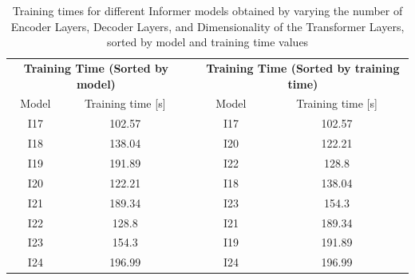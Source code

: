 \begin{table}[]
    \begin{tabular}{ccccc}
    \multicolumn{2}{c}{\textbf{Training   Time (Sorted by model)}} &  & \multicolumn{2}{c}{\textbf{Training Time (Sorted   by training time)}} \\
    Model             & Training time {[}s{]}                      &  & Model                 & Training time {[}s{]}                          \\
    I17               & \cellcolor[HTML]{63BE7B}102.57             &  & I17                   & \cellcolor[HTML]{63BE7B}102.57                 \\
    I18               & \cellcolor[HTML]{E1E282}138.04             &  & I20                   & \cellcolor[HTML]{A9D27F}122.21                 \\
    I19               & \cellcolor[HTML]{F9776E}191.89             &  & I22                   & \cellcolor[HTML]{C0D980}128.8                  \\
    I20               & \cellcolor[HTML]{A9D27F}122.21             &  & I18                   & \cellcolor[HTML]{E1E282}138.04                 \\
    I21               & \cellcolor[HTML]{FA7D6F}189.34             &  & I23                   & \cellcolor[HTML]{FED781}154.3                  \\
    I22               & \cellcolor[HTML]{C0D980}128.8              &  & I21                   & \cellcolor[HTML]{FA7D6F}189.34                 \\
    I23               & \cellcolor[HTML]{FED781}154.3              &  & I19                   & \cellcolor[HTML]{F9776E}191.89                 \\
    I24               & \cellcolor[HTML]{F8696B}196.99             &  & I24                   & \cellcolor[HTML]{F8696B}196.99                
    \end{tabular}
    \caption{Training times for different Informer models obtained by varying the number of Encoder Layers, Decoder Layers, and Dimensionality of the Transformer Layers, sorted by model and training time values}
    \label{I4_T}
    \end{table}

